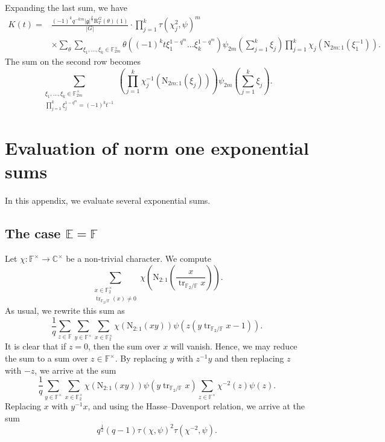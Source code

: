 \documentclass[12pt, reqno]{amsart}
\theoremstyle{definition}
\theoremstyle{definition}
\theoremstyle{definition}
\newcommand{\cComplex}{\mathbb{C}}
\newcommand{\multiplicativegroup}[1]{#1^{\times}}
\newcommand{\sizeof}[1]{\left|#1\right|}
\newcommand{\fieldCharacter}{\psi}
\newcommand{\trace}{\operatorname{tr}}
\newcommand{\FieldNorm}[2]{\mathrm{N}_{#1:#2}}
\newcommand{\finiteField}{\mathbb{F}}
\newcommand{\quadraticExtension}{\mathbb{E}}
\newcommand{\finiteFieldExtension}[1]{\finiteField_{#1}}
\newcommand{\lieAlgebra}{\mathfrak{g}}
\newcommand{\DeligneLusztigInduction}[2]{\mathrm{R}_{#1}^{#2}}
\begin{document}
Expanding the last sum, we have
\begin{align*}
	K\left(t\right) = & \frac{\left(-1\right)^k q^{-km}  \sizeof{\lieAlgebra}^{\frac{k}{2}} \DeligneLusztigInduction{T}{G}\left(\theta\right)\left(1\right)}{\sizeof{G}} \cdot \prod_{j=1}^k \tau\left(\chi_j^2, \fieldCharacter\right)^m \\
	 & \times \sum_{\theta} \sum_{\xi_1,\dots,\xi_k \in \multiplicativegroup{\finiteFieldExtension{2m}}} \theta\left( \left(-1\right)^k t \xi_1^{1-q^m} \dots \xi_k^{1-q^m} \right) \fieldCharacter_{2m}\left(\sum_{j=1}^k \xi_j\right) \prod_{j=1}^k \chi_j\left(\FieldNorm{2m}{1}\left(\xi_1^{-1} \right)\right).
\end{align*}
The sum on the second row becomes
$$\sum_{\substack{\xi_1,\dots,\xi_k \in \multiplicativegroup{\finiteFieldExtension{2m}}\\
\prod_{j=1}^k \xi_j^{1-q^m} = \left(-1\right)^k t^{-1}}} \left(\prod_{j=1}^k \chi_j^{-1}\left(\FieldNorm{2m}{1}\left(\xi_j \right)\right)\right) \fieldCharacter_{2m}\left(\sum_{j=1}^k \xi_j\right).$$

\appendix
\section{Evaluation of norm one exponential sums}

In this appendix, we evaluate several exponential sums.

\subsection{The case $\quadraticExtension = \finiteField$}
Let $\chi \colon \multiplicativegroup{\finiteField} \to \multiplicativegroup{\cComplex}$ be a non-trivial character. We compute $$\sum_{\substack{x \in \multiplicativegroup{\finiteFieldExtension{2}}\\
	\trace_{\finiteFieldExtension{2} \slash \finiteField}\left(x\right) \ne 0}} \chi\left(\FieldNorm{2}{1}\left(\frac{x}{\trace_{\finiteFieldExtension{2} \slash \finiteField} x}\right) \right).$$
As usual, we rewrite this sum as
$$\frac{1}{q} \sum_{z \in \finiteField} \sum_{y \in \multiplicativegroup{\finiteField}} \sum_{x \in \multiplicativegroup{\finiteFieldExtension{2}}} \chi\left(\FieldNorm{2}{1}\left(xy\right)\right) \fieldCharacter\left(z\left(y \trace_{\finiteFieldExtension{2} \slash \finiteField} x - 1\right)\right).$$
It is clear that if $z = 0$, then the sum over $x$ will vanish. Hence, we may reduce the sum to a sum over $z \in \multiplicativegroup{\finiteField}$. By replacing $y$ with $z^{-1} y$ and then replacing $z$ with $-z$, we arrive at the sum
$$\frac{1}{q} \sum_{y \in \multiplicativegroup{\finiteField}} \sum_{x \in \multiplicativegroup{\finiteFieldExtension{2}}} \chi\left(\FieldNorm{2}{1}\left(xy\right)\right) \fieldCharacter\left(y \trace_{\finiteFieldExtension{2} \slash \finiteField} x\right) \sum_{z \in \multiplicativegroup{\finiteField}} \chi^{-2}\left(z\right)\fieldCharacter\left(z\right).$$
Replacing $x$ with $y^{-1}x$, and using the Hasse--Davenport relation, we arrive at the sum
$$q^{\frac{1}{2}} \left(q-1\right) \tau\left(\chi, \fieldCharacter\right)^2 \tau\left(\chi^{-2}, \fieldCharacter\right).$$
\end{document}
